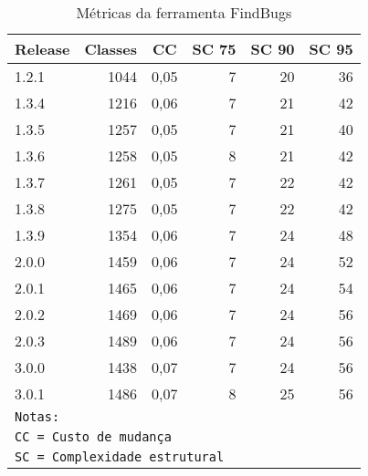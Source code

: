 \begin{table}[H]
\caption{Métricas da ferramenta FindBugs}
  \centering
\begin{tabular}{|l|r|r|r|r|r|}
\hline
\multicolumn{1}{|c|}{\textbf{Release}} & \multicolumn{1}{c|}{\textbf{Classes}} & \multicolumn{1}{c|}{\textbf{CC}} & \multicolumn{1}{c|}{\textbf{SC 75}} & \multicolumn{1}{c|}{\textbf{SC 90}} & \multicolumn{1}{c|}{\textbf{SC 95}} \\ \hline
1.2.1 & 1044 & 0,05 & 7 & 20 & 36 \\ \hline
1.3.4 & 1216 & 0,06 & 7 & 21 & 42 \\ \hline
1.3.5 & 1257 & 0,05 & 7 & 21 & 40 \\ \hline
1.3.6 & 1258 & 0,05 & 8 & 21 & 42 \\ \hline
1.3.7 & 1261 & 0,05 & 7 & 22 & 42 \\ \hline
1.3.8 & 1275 & 0,05 & 7 & 22 & 42 \\ \hline
1.3.9 & 1354 & 0,06 & 7 & 24 & 48 \\ \hline
2.0.0 & 1459 & 0,06 & 7 & 24 & 52 \\ \hline
2.0.1 & 1465 & 0,06 & 7 & 24 & 54 \\ \hline
2.0.2 & 1469 & 0,06 & 7 & 24 & 56 \\ \hline
2.0.3 & 1489 & 0,06 & 7 & 24 & 56 \\ \hline
3.0.0 & 1438 & 0,07 & 7 & 24 & 56 \\ \hline
3.0.1 & 1486 & 0,07 & 8 & 25 & 56 \\ \hline
\multicolumn{6}{l}{\texttt{Notas:}} \\
\multicolumn{6}{l}{\texttt{CC = Custo de mudança}} \\
\multicolumn{6}{l}{\texttt{SC = Complexidade estrutural}} \\ \hline
\end{tabular}
\label{metricas-findbugs}
\end{table}

